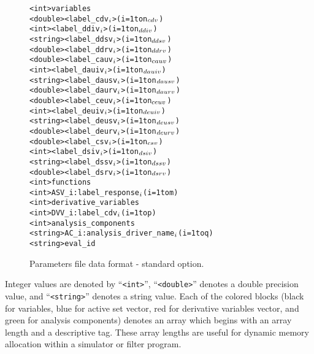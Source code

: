 \begin{figure}
  \centering
  \begin{bigbox}
  \begin{alltt}
    <int>    variables
    <double> <label_cdv\(\sb{i}\)>         (i = 1 to n\(\sb{cdv}\))
    <int>    <label_ddiv\(\sb{i}\)>        (i = 1 to n\(\sb{ddiv}\))
    <string> <label_ddsv\(\sb{i}\)>        (i = 1 to n\(\sb{ddsv}\))
    <double> <label_ddrv\(\sb{i}\)>        (i = 1 to n\(\sb{ddrv}\))
    <double> <label_cauv\(\sb{i}\)>        (i = 1 to n\(\sb{cauv}\))
    <int>    <label_dauiv\(\sb{i}\)>       (i = 1 to n\(\sb{dauiv}\))
    <string> <label_dausv\(\sb{i}\)>       (i = 1 to n\(\sb{dausv}\))
    <double> <label_daurv\(\sb{i}\)>       (i = 1 to n\(\sb{daurv}\))
    <double> <label_ceuv\(\sb{i}\)>        (i = 1 to n\(\sb{ceuv}\))
    <int>    <label_deuiv\(\sb{i}\)>       (i = 1 to n\(\sb{deuiv}\))
    <string> <label_deusv\(\sb{i}\)>       (i = 1 to n\(\sb{deusv}\))
    <double> <label_deurv\(\sb{i}\)>       (i = 1 to n\(\sb{deurv}\))
    <double> <label_csv\(\sb{i}\)>         (i = 1 to n\(\sb{csv}\))
    <int>    <label_dsiv\(\sb{i}\)>        (i = 1 to n\(\sb{dsiv}\))
    <string> <label_dssv\(\sb{i}\)>        (i = 1 to n\(\sb{dssv}\))
    <double> <label_dsrv\(\sb{i}\)>        (i = 1 to n\(\sb{dsrv}\)) \color{blue}
    <int>    functions
    <int>    ASV_i:label_response\(\sb{i}\)       (i = 1 to m) \color{red}
    <int>    derivative_variables
    <int>    DVV_i:label_cdv\(\sb{i}\)            (i = 1 to p) \color{green}
    <int>    analysis_components
    <string> AC_i:analysis_driver_name\(\sb{i}\)  (i = 1 to q)
    <string> eval_id
  \end{alltt}
  \end{bigbox}
  \caption{Parameters file data format - standard option.}
  \label{variables:figure01}
\end{figure}

Integer values are denoted by ``\texttt{<int>}'',
``\texttt{<double>}'' denotes a double precision value, and
``\texttt{<string>}'' denotes a string value. Each of the colored
blocks (black for variables, blue for active set vector, red for
derivative variables vector, and green for analysis components)
denotes an array which begins with an array length and a descriptive
tag.  These array lengths are useful for dynamic memory allocation
within a simulator or filter program.

